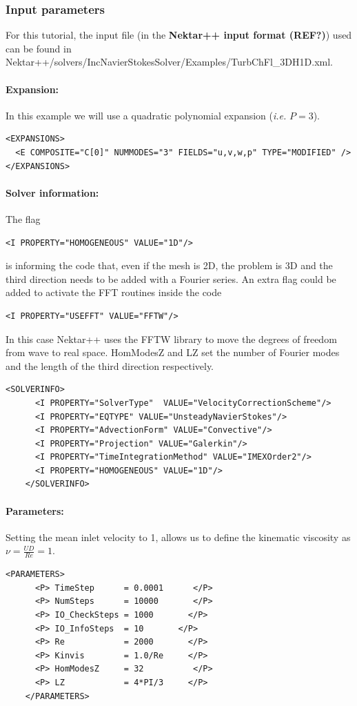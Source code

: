 \subsubsection{Input parameters}
For this tutorial, the input file (in the \textbf{Nektar++ input format (REF?)}) used can be found in Nektar++/solvers/IncNavierStokesSolver/Examples/TurbChFl\_3DH1D.xml.

\paragraph{Expansion:~} In this example we will use a quadratic polynomial expansion (\textit{i.e.} $P=3$).
\begin{lstlisting}[style=XMLStyle]
<EXPANSIONS>
  <E COMPOSITE="C[0]" NUMMODES="3" FIELDS="u,v,w,p" TYPE="MODIFIED" />
</EXPANSIONS>
\end{lstlisting}

\paragraph{Solver information:~} The flag 
\begin{lstlisting}[style=XMLStyle]
<I PROPERTY="HOMOGENEOUS" VALUE="1D"/>
\end{lstlisting}
is informing the code that, even if the mesh is 2D, the problem is 3D and the third direction needs to be added with a Fourier series. An extra flag could be added to activate the FFT routines inside the code 
\begin{lstlisting}[style=XMLStyle]
<I PROPERTY="USEFFT" VALUE="FFTW"/>
\end{lstlisting}
In this case Nektar++ uses the FFTW library to move the degrees of freedom from wave to real space. HomModesZ and LZ set the number of Fourier modes and the length of the third direction respectively.

\begin{lstlisting}[style=XMLStyle]
    <SOLVERINFO>
      <I PROPERTY="SolverType"  VALUE="VelocityCorrectionScheme"/>
      <I PROPERTY="EQTYPE" VALUE="UnsteadyNavierStokes"/>
      <I PROPERTY="AdvectionForm" VALUE="Convective"/>
      <I PROPERTY="Projection" VALUE="Galerkin"/>
      <I PROPERTY="TimeIntegrationMethod" VALUE="IMEXOrder2"/>
      <I PROPERTY="HOMOGENEOUS" VALUE="1D"/>
    </SOLVERINFO>
\end{lstlisting}

\paragraph{Parameters:~} Setting the mean inlet velocity to 1, allows us to define the kinematic viscosity as $\nu = \frac{UD}{Re}=1$.
\begin{lstlisting}[style=XMLStyle]
    <PARAMETERS>
      <P> TimeStep      = 0.0001      </P>
      <P> NumSteps      = 10000       </P>
      <P> IO_CheckSteps = 1000       </P>
      <P> IO_InfoSteps  = 10       </P>
      <P> Re            = 2000       </P>
      <P> Kinvis        = 1.0/Re     </P>
      <P> HomModesZ     = 32          </P>
      <P> LZ            = 4*PI/3     </P>
    </PARAMETERS>
\end{lstlisting}

